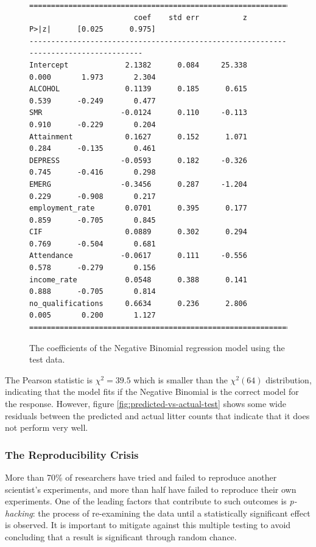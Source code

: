 \documentclass{thesis}
\begin{document}
\begin{figure}[h!]
    \centering
\footnotesize
\begin{verbatim}
=====================================================================================
                        coef    std err          z      P>|z|      [0.025      0.975]
-------------------------------------------------------------------------------------
Intercept             2.1382      0.084     25.338      0.000       1.973       2.304
ALCOHOL               0.1139      0.185      0.615      0.539      -0.249       0.477
SMR                  -0.0124      0.110     -0.113      0.910      -0.229       0.204
Attainment            0.1627      0.152      1.071      0.284      -0.135       0.461
DEPRESS              -0.0593      0.182     -0.326      0.745      -0.416       0.298
EMERG                -0.3456      0.287     -1.204      0.229      -0.908       0.217
employment_rate       0.0701      0.395      0.177      0.859      -0.705       0.845
CIF                   0.0889      0.302      0.294      0.769      -0.504       0.681
Attendance           -0.0617      0.111     -0.556      0.578      -0.279       0.156
income_rate           0.0548      0.388      0.141      0.888      -0.705       0.814
no_qualifications     0.6634      0.236      2.806      0.005       0.200       1.127
=====================================================================================
\end{verbatim}
\normalsize
    \caption{The coefficients of the Negative Binomial regression model using the test data.}
    \label{fig:nb-coeff-test}
\end{figure}

The Pearson statistic is $\chi^2 = 39.5$ which is smaller than the $\chi^2(64)$ distribution, indicating that the model fits if the Negative Binomial is the correct model for the response. However, figure \ref{fig:predicted-vs-actual-test} shows some wide residuals between the predicted and actual litter counts that indicate that it does not perform very well.

\subsubsection{The Reproducibility Crisis}

More than 70\% of researchers have tried and failed to reproduce another scientist's experiments, and more than half have failed to reproduce their own experiments\cite{Baker2016}. One of the leading factors that contribute to such outcomes is \textit{p-hacking}: the process of re-examining the data until a statistically significant effect is observed. It is important to mitigate against this multiple testing to avoid concluding that a result is significant through random chance.
\end{document}
